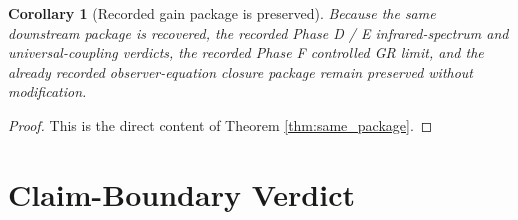 \documentclass[11pt]{article}
\newtheorem{corollary}{Corollary}
\begin{document}
\begin{corollary}[Recorded gain package is preserved]
\label{cor:gains}
Because the same downstream package is recovered, the recorded Phase D / E infrared-spectrum and universal-coupling verdicts, the recorded Phase F controlled GR limit, and the already recorded observer-equation closure package remain preserved without modification.
\end{corollary}

\begin{proof}
This is the direct content of Theorem \ref{thm:same_package}.
\end{proof}

\section{Claim-Boundary Verdict}
\end{document}
